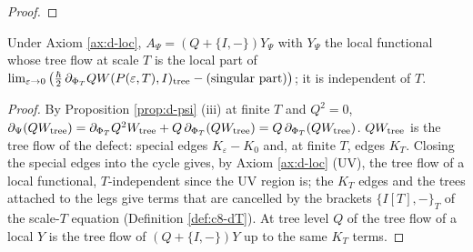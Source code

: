 \begin{proof}
\end{proof}

\begin{proposition}
\label{prop:d-Ypsi}
Under Axiom \ref{ax:d-loc}, $A_\Psi=(Q+\{I,-\})Y_\Psi$ with $Y_\Psi$ the local functional whose tree flow at scale $T$ is the local part of $\lim_{\varepsilon\to0}\big(\tfrac\hbar2\,\partial_{\Phi_T}QW(P(\varepsilon,T),I)_{\rm tree}-(\text{singular part})\big)$; it is independent of $T$.
\end{proposition}

\begin{proof}
By Proposition \ref{prop:d-psi} (iii) at finite $T$ and $Q^2=0$, $\partial_\Psi(QW_{\rm tree})=\partial_{\Phi_T}Q^2W_{\rm tree}+Q\,\partial_{\Phi_T}(QW_{\rm tree})=Q\,\partial_{\Phi_T}(QW_{\rm tree})$. $QW_{\rm tree}$ is the tree flow of the defect: special edges $K_\varepsilon-K_0$ and, at finite $T$, edges $K_T$. Closing the special edges into the cycle gives, by Axiom \ref{ax:d-loc} (UV), the tree flow of a local functional, $T$-independent since the UV region is; the $K_T$ edges and the trees attached to the legs give terms that are cancelled by the brackets $\{I[T],-\}_T$ of the scale-$T$ equation (Definition \ref{def:c8-dT}). At tree level $Q$ of the tree flow of a local $Y$ is the tree flow of $(Q+\{I,-\})Y$ up to the same $K_T$ terms.
\end{proof}

